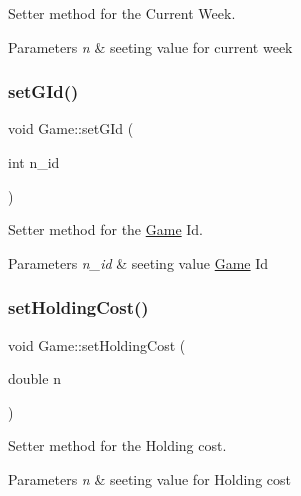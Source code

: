 Setter method for the Current Week. 


\begin{DoxyParams}{Parameters}
{\em n} & seeting value for current week \\
\hline
\end{DoxyParams}
\mbox{\label{class_game_a4216dd9e4b966f68cebcd4914a203edb}} 
\subsubsection{\texorpdfstring{set\+G\+Id()}{setGId()}}
{\footnotesize\ttfamily void Game\+::set\+G\+Id (\begin{DoxyParamCaption}\item[{int}]{n\+\_\+id }\end{DoxyParamCaption})}



Setter method for the \hyperlink{class_game}{Game} Id. 


\begin{DoxyParams}{Parameters}
{\em n\+\_\+id} & seeting value \hyperlink{class_game}{Game} Id \\
\hline
\end{DoxyParams}
\mbox{\label{class_game_a5136cc3fd07b605ed6df658024eb1e88}} 
\subsubsection{\texorpdfstring{set\+Holding\+Cost()}{setHoldingCost()}}
{\footnotesize\ttfamily void Game\+::set\+Holding\+Cost (\begin{DoxyParamCaption}\item[{double}]{n }\end{DoxyParamCaption})}



Setter method for the Holding cost. 


\begin{DoxyParams}{Parameters}
{\em n} & seeting value for Holding cost \\
\hline
\end{DoxyParams}
\mbox{\label{class_game_a8da75fddaf91545459de45a52f604ebb}} 

